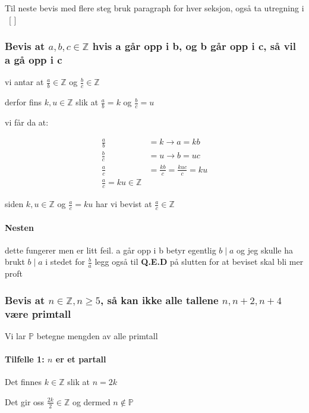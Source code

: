 \documentclass{article}
\begin{document}
Til neste bevis med flere steg bruk paragraph for hver seksjon, også ta utregning i \ [ ] \

\subsubsection{Bevis at $a,b,c \in \mathbb{Z}$ hvis a går opp i b, og b går opp i c, så vil a gå opp i c }

vi antar at $\frac{a}{b} \in \mathbb{Z}$ og $\frac{b}{c} \in \mathbb{Z}$

derfor fins $k, u \in \mathbb{Z}$ slik at $\frac{a}{b}=k$ og $\frac{b}{c}=u$

vi får da at:

\begin{align*}
    \frac{a}{b} &= k \rightarrow a = kb \\
    \frac{b}{c} &= u \rightarrow b = uc \\
    \frac{a}{c} &= \frac{kb}{c} = \frac{kuc}{c}=ku \\
    \frac{a}{c}=ku \in \mathbb{Z}
\end{align*}

siden $k,u \in \mathbb{Z}$ og $\frac{a}{c}=ku$ har vi bevist at $\frac{a}{c} \in \mathbb{Z}$

\paragraph{Nesten}

dette fungerer men er litt feil. a går opp i b betyr egentlig $b \mid a$
og jeg skulle ha brukt $b \mid a$ i stedet for $\frac{b}{a}$
legg også til \textbf{Q.E.D} på slutten for at beviset skal bli mer proft

\subsubsection{Bevis at $n \in \mathbb{Z}, n \geq 5$, så kan ikke alle tallene $n, n+2, n+4$ være primtall}

Vi lar $\mathbb{P}$ betegne mengden av alle primtall

\paragraph{Tilfelle 1: $n$ er et partall}

Det finnes $k \in \mathbb{Z}$ slik at $n=2k$

Det gir oss $\frac{2k}{2} \in \mathbb{Z}$ og dermed $n \notin \mathbb{P}$
\end{document}
